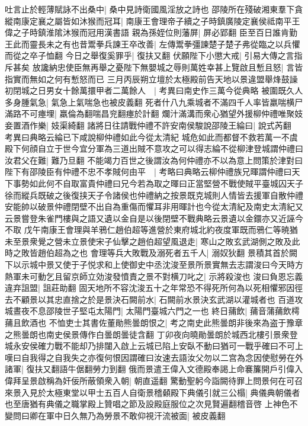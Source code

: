 吐言止於輕薄賦詠不出桑中|{
	桑中見詩衛國風淫放之詩也}
邵陵所在殘破湘東羣下貪縱南康定襄之屬皆如沐猴而冠耳|{
	南康王會理帝子續之子時鎮廣陵定襄侯祗南平王偉之子時鎮淮隂沐猴而冠用漢書語}
親為孫姪位則藩屏|{
	屏必郢翻}
臣至百日誰肯勤王此而靈長未之有也昔鬻拳兵諫王卒改善|{
	左傳鬻拳彊諫楚子楚子弗從臨之以兵懼而從之卒子恤翻}
今日之舉復奚罪乎|{
	復扶又翻}
伏願陛下小懲大戒|{
	引易大傳之言指斥甚矣}
放讒納忠使臣無再舉之憂陛下無嬰城之辱則萬姓幸甚上覽啟且慙且怒|{
	言皆指實而無如之何有慙怒而已}
三月丙辰朔立壇於太極殿前告天地以景違盟舉烽鼓譟初閉城之日男女十餘萬擐甲者二萬餘人　|{
	考異曰南史作三萬今從典略}
被圍既久人多身腫氣急|{
	氣急上氣喘急也被皮義翻}
死者什八九乘城者不滿四千人率皆羸喘横尸滿路不可瘞埋|{
	羸倫為翻喘昌兖翻瘞於計翻}
爛汁滿溝而衆心猶望外援柳仲禮唯聚妓妾置酒作樂|{
	妓渠綺翻}
諸將日往請戰仲禮不許安南侯駿說邵陵王綸曰|{
	說式芮翻　考異曰典略云綸已下咸說柳仲禮如此今從太清紀}
城危如此而都督不救若萬一不虞殿下何顔自立于世今宜分軍為三道出賊不意攻之可以得志綸不從柳津登城謂仲禮曰汝君父在難|{
	難乃旦翻}
不能竭力百世之後謂汝為何仲禮亦不以為意上問策於津對曰陛下有邵陵臣有仲禮不忠不孝賊何由平　|{
	考略曰典略云柳仲禮族兄暉謂仲禮曰天下事勢如此何不自取富貴仲禮曰兄今若為取之暉曰正當堅營不戰使賊平臺城囚天子徐而縱兵既破之後復挟天子令諸侯也仲禮納之按景既克城則人情皆去援軍自散仲禮安能帥以破景仲禮閉壁不出自為重傷而懼耳非用暉計也今從太清紀及南史太清紀又云景嘗登朱雀門樓與之語又遺以金自是以後閉壁不戰典略云景遺以金鐶亦又近誣今不取}
戊午南康王會理與羊鴉仁趙伯超等進營於東府城北約夜度軍既而鴉仁等暁猶未至景衆覺之營未立景使宋子仙擊之趙伯超望風退走|{
	寒山之敗玄武湖側之敗及此時之敗皆趙伯超為之也}
會理等兵大敗戰及溺死者五千人|{
	溺奴狄翻}
景積其首於闕下以示城中景又使于子悦求和上使御史中丞沈浚至景所景實無去志謂浚曰今天時方熱軍未可動乞且留京師立効浚發憤責之景不對横刀叱之|{
	示將殺浚也}
浚曰負恩忘義違弃詛盟|{
	詛莊助翻}
固天地所不容沈浚五十之年常恐不得死所何為以死相懼邪因徑去不顧景以其忠直捨之於是景決石闕前水|{
	石闕前水景決玄武湖以灌城者也}
百道攻城晝夜不息邵陵世子堅屯太陽門|{
	太陽門臺城六門之一也}
終日蒱飲|{
	蒱音蒲蒱飲樗蒱且飲酒也}
不恤吏士其書佐董勛熊曇朗恨之|{
	考之南史此熊曇朗非後來為盗于豫章之熊曇朗也南史侯景傳作白曇朗曇徒含翻}
丁卯夜向曉勛曇朗於城西北樓引景衆登城永安侯確力戰不能却乃排闥入啟上云城已陷上安臥不動曰猶可一戰乎確曰不可上嘆曰自我得之自我失之亦復何恨因謂確曰汝速去語汝父勿以二宫為念因使慰勞在外諸軍|{
	復扶又翻語牛倨翻勞力到翻}
俄而景遣王偉入文德殿奉謁上命褰簾開戶引偉入偉拜呈景啟稱為奸佞所蔽領衆入朝|{
	朝直遥翻}
驚動聖躬今詣闕待罪上問景何在可召來景入見於太極東堂以甲士五百人自衛景稽顙殿下典儀引就三公榻|{
	典儀典朝儀者也至唐猶有典儀之職掌殿上贊唱之節及設殿庭服位之次見賢遍翻稽音啓}
上神色不變問曰卿在軍中日久無乃為勞景不敢仰視汗流被面|{
	被皮義翻}
